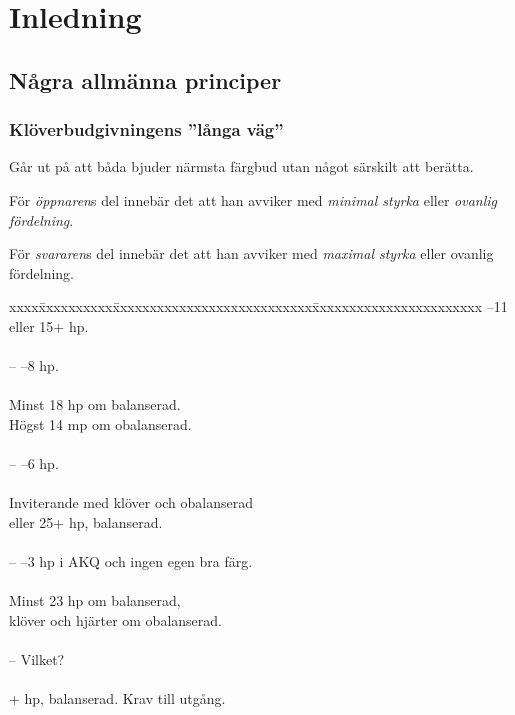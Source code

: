 \chapter{Inledning}

\section{N\aa{}gra allm\"anna principer}

\subsection{Kl\"overbudgivningens ''långa v\"ag''}

G{\aa}r ut p{\aa} att b{\aa}da
     bjuder n\"armsta f\"argbud utan n{\aa}got s\"arskilt att ber\"atta.

     F\"or {\em \"oppnaren}\/s del inneb\"ar det att han avviker med {\em 
     minimal styrka} eller {\em ovanlig f\"ordelning}.

     F\"or {\em svararen}\/s del inneb\"ar det att han avviker med 
    {\em maximal styrka} eller ovanlig fördelning.

\begin{tabbing}
xxxx\= xxxxxxxxxx\=xxxxxxxxxxxxxxxxxxxxxxxxxxx\=xxxxxxxxxxxxxxxxxxxxxxx \kill
\> \>        --11 eller 15+ hp. \\
\\
\>       \> --  --8 hp. \\
\\
\> \>        \> Minst 18 hp om balanserad. \\
\>       \>        \> H\"ogst 14 mp om obalanserad. \\
\\
\>       \> -- --6 hp. \\
\\
\> \>        \> Inviterande med klöver och obalanserad \\
\>       \>        \> eller 25+ hp, balanserad. \\
\\
\>       \> -- --3 hp i AKQ och ingen egen bra färg. \\
\\
\> \>        \> Minst 23 hp om balanserad, \\
\>       \>        \> klöver och hjärter om obalanserad. \\
\\
\>       \> -- \> Vilket?\\
\\
\>  \>   + hp, balanserad. Krav till utgång.
\end{tabbing}

